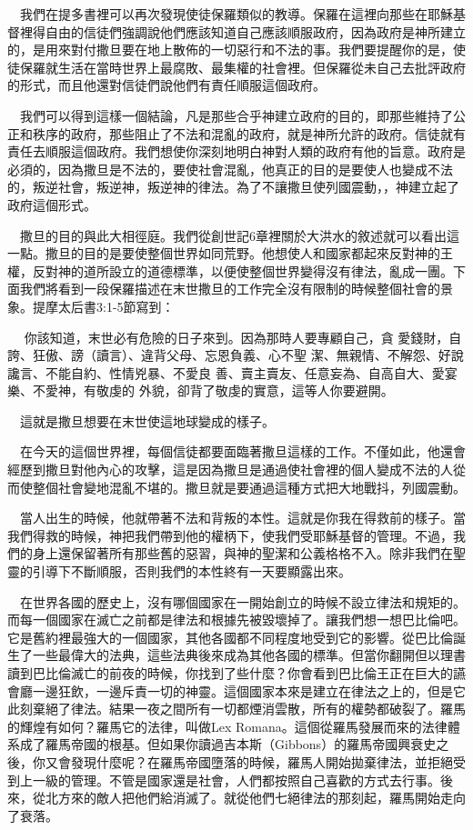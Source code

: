 \documentclass{book}
\begin{document}
　我們在提多書裡可以再次發現使徒保羅類似的教導。保羅在這裡向那些在耶穌基督裡得自由的信徒們強調說他們應該知道自己應該順服政府，因為政府是神所建立的，是用來對付撒旦要在地上散佈的一切惡行和不法的事。我們要提醒你的是，使徒保羅就生活在當時世界上最腐敗、最集權的社會裡。但保羅從未自己去批評政府的形式，而且他還對信徒們說他們有責任順服這個政府。

　我們可以得到這樣一個結論，凡是那些合乎神建立政府的目的，即那些維持了公正和秩序的政府，那些阻止了不法和混亂的政府，就是神所允許的政府。信徒就有責任去順服這個政府。我們想使你深刻地明白神對人類的政府有他的旨意。政府是必須的，因為撒旦是不法的，要使社會混亂，他真正的目的是要使人也變成不法的，叛逆社會，叛逆神，叛逆神的律法。為了不讓撒旦使列國震動，，神建立起了政府這個形式。

　撒旦的目的與此大相徑庭。我們從創世記6章裡關於大洪水的敘述就可以看出這一點。撒旦的目的是要使整個世界如同荒野。他想使人和國家都起來反對神的王權，反對神的道所設立的道德標準，以便使整個世界變得沒有律法，亂成一團。下面我們將看到一段保羅描述在末世撒旦的工作完全沒有限制的時候整個社會的景象。提摩太后書3:1-5節寫到：

　 你該知道，末世必有危險的日子來到。因為那時人要專顧自己，貪 愛錢財，自誇、狂傲、謗（讀言）、違背父母、忘恩負義、心不聖 潔、無親情、不解怨、好說讒言、不能自約、性情兇暴、不愛良 善、賣主賣友、任意妄為、自高自大、愛宴樂、不愛神，有敬虔的 外貌，卻背了敬虔的實意，這等人你要避開。

　這就是撒旦想要在末世使這地球變成的樣子。

　在今天的這個世界裡，每個信徒都要面臨著撒旦這樣的工作。不僅如此，他還會經歷到撒旦對他內心的攻擊，這是因為撒旦是通過使社會裡的個人變成不法的人從而使整個社會變地混亂不堪的。撒旦就是要通過這種方式把大地戰抖，列國震動。

　當人出生的時候，他就帶著不法和背叛的本性。這就是你我在得救前的樣子。當我們得救的時候，神把我們帶到他的權柄下，使我們受耶穌基督的管理。不過，我們的身上還保留著所有那些舊的惡習，與神的聖潔和公義格格不入。除非我們在聖靈的引導下不斷順服，否則我們的本性終有一天要顯露出來。

　在世界各國的歷史上，沒有哪個國家在一開始創立的時候不設立律法和規矩的。而每一個國家在滅亡之前都是律法和根據先被毀壞掉了。讓我們想一想巴比倫吧。它是舊約裡最強大的一個國家，其他各國都不同程度地受到它的影響。從巴比倫誕生了一些最偉大的法典，這些法典後來成為其他各國的標準。但當你翻開但以理書讀到巴比倫滅亡的前夜的時候，你找到了些什麼？你會看到巴比倫王正在巨大的讌會廳一邊狂飲，一邊斥責一切的神靈。這個國家本來是建立在律法之上的，但是它此刻棄絕了律法。結果一夜之間所有一切都煙消雲散，所有的權勢都破裂了。羅馬的輝煌有如何？羅馬它的法律，叫做Lex Romana。這個從羅馬發展而來的法律體系成了羅馬帝國的根基。但如果你讀過吉本斯（Gibbons）的羅馬帝國興衰史之後，你又會發現什麼呢？在羅馬帝國墮落的時候，羅馬人開始拋棄律法，並拒絕受到上一級的管理。不管是國家還是社會，人們都按照自己喜歡的方式去行事。後來，從北方來的敵人把他們給消滅了。就從他們七絕律法的那刻起，羅馬開始走向了衰落。
\end{document}
